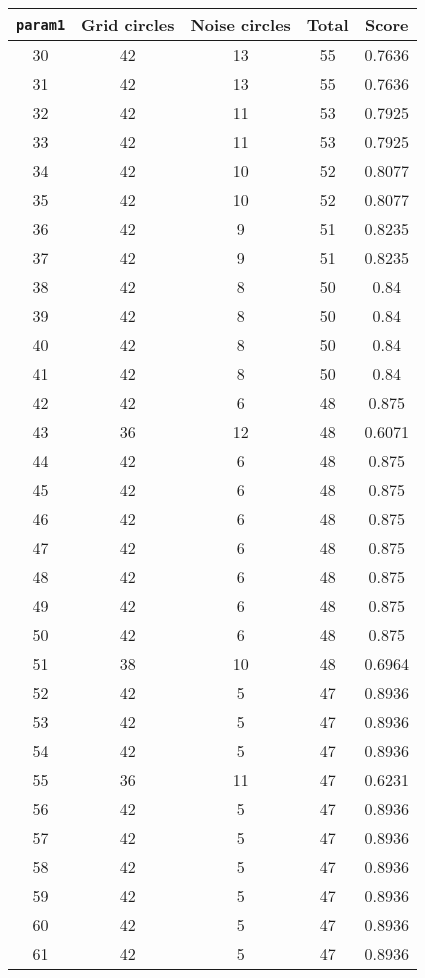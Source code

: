 \documentclass[letterpaper, 12pt]{article}
\begin{document}
\begin{longtable}{|c|c|c|c|c|}
\hline
\textbf{\texttt{param1}} & \textbf{Grid circles} & \textbf{Noise circles} & \textbf{Total} & \textbf{Score} \\
\hline
30 & 42 & 13 & 55 & 0.7636 \\
\hline
31 & 42 & 13 & 55 & 0.7636 \\
\hline
32 & 42 & 11 & 53 & 0.7925 \\
\hline
33 & 42 & 11 & 53 & 0.7925 \\
\hline
34 & 42 & 10 & 52 & 0.8077 \\
\hline
35 & 42 & 10 & 52 & 0.8077 \\
\hline
36 & 42 & 9 & 51 & 0.8235 \\
\hline
37 & 42 & 9 & 51 & 0.8235 \\
\hline
38 & 42 & 8 & 50 & 0.84 \\
\hline
39 & 42 & 8 & 50 & 0.84 \\
\hline
40 & 42 & 8 & 50 & 0.84 \\
\hline
41 & 42 & 8 & 50 & 0.84 \\
\hline
42 & 42 & 6 & 48 & 0.875 \\
\hline
43 & 36 & 12 & 48 & 0.6071 \\
\hline
44 & 42 & 6 & 48 & 0.875 \\
\hline
45 & 42 & 6 & 48 & 0.875 \\
\hline
46 & 42 & 6 & 48 & 0.875 \\
\hline
47 & 42 & 6 & 48 & 0.875 \\
\hline
48 & 42 & 6 & 48 & 0.875 \\
\hline
49 & 42 & 6 & 48 & 0.875 \\
\hline
50 & 42 & 6 & 48 & 0.875 \\
\hline
51 & 38 & 10 & 48 & 0.6964 \\
\hline
52 & 42 & 5 & 47 & 0.8936 \\
\hline
53 & 42 & 5 & 47 & 0.8936 \\
\hline
54 & 42 & 5 & 47 & 0.8936 \\
\hline
55 & 36 & 11 & 47 & 0.6231 \\
\hline
56 & 42 & 5 & 47 & 0.8936 \\
\hline
57 & 42 & 5 & 47 & 0.8936 \\
\hline
58 & 42 & 5 & 47 & 0.8936 \\
\hline
59 & 42 & 5 & 47 & 0.8936 \\
\hline
60 & 42 & 5 & 47 & 0.8936 \\
\hline
61 & 42 & 5 & 47 & 0.8936 \\

\end{longtable}
\end{document}

